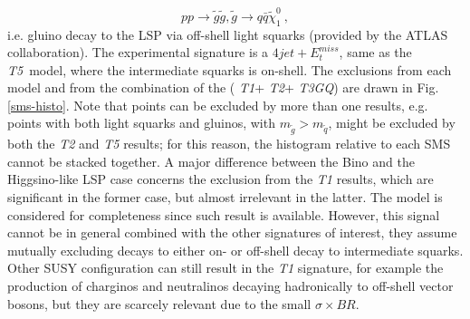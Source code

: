 \documentclass[a4paper,11pt]{article}
\newcommand{\TGQ}{ \textit{T3GQ}}
\newcommand{\Tone}{ \textit{T1}}
\newcommand{\Ttwo}{ \textit{T2}}
\newcommand{\Tfive}{ \textit{T5}}
\begin{document}
\begin{equation}
p p \rightarrow \tilde g \tilde g , \tilde g \rightarrow q \bar q \tilde \chi_1 ^0 \ , 
\end{equation}
i.e. gluino decay to the LSP via off-shell light squarks (provided by the ATLAS collaboration). The experimental signature is a $4jet+E_t^{miss}$, same as the \Tfive~model, where the intermediate squarks is on-shell. The exclusions from each model and from the combination of the (\Tone+\Ttwo+\TGQ)  are drawn in Fig. \ref{sms-histo}. 
%
%
%
Note that points can be excluded by more than one results, e.g. points with both light squarks and gluinos, with $m_{\tilde g} > m_{\tilde q}$, might be excluded by both the \textit{T2} and \textit{T5} results; for this reason, the histogram relative to each SMS cannot be stacked together. A major difference between the Bino and the Higgsino-like LSP case concerns the exclusion from the \textit{T1} results, which are significant in the former case, but almost irrelevant in the latter. The model is considered for completeness since such result is available. However, this signal cannot be in general combined with the other signatures of interest, they assume mutually excluding decays to either on- or off-shell decay to intermediate squarks. Other SUSY configuration can still result in the \textit{T1} signature, for example the production of charginos and neutralinos decaying hadronically to off-shell vector bosons, but they are scarcely relevant due to the small $\sigma \times BR$.  
\end{document}
